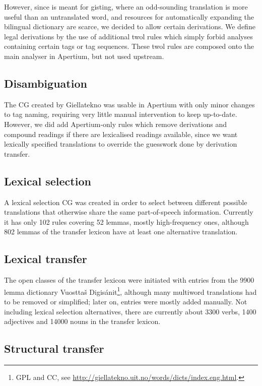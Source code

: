 However, since \smenob is meant for gisting, where an odd-sounding
translation is more useful than an untranslated word, and resources
for automatically expanding the bilingual dictionary are scarce, we
decided to allow certain derivations. We define legal derivations by
the use of additional twol rules which simply forbid analyses
containing certain tags or tag sequences. These twol rules are
composed onto the main analyser in Apertium, but not used upstream.

\subsection{Disambiguation}
The CG created by Giellatekno was usable in Apertium with only minor
changes to tag naming, requiring very little manual intervention to
keep up-to-date. However, we did add Apertium-only rules which remove
derivations and compound readings if there are lexicalised readings
available, since we want lexically specified translations to override
the guesswork done by derivation transfer.

\subsection{Lexical selection}
A lexical selection CG was created in order to select between
different possible translations that otherwise share the same
part-of-speech information. Currently it has only 102 rules covering
52 lemmas, mostly high-frequency ones, although 802 lemmas of the
transfer lexicon have at least one alternative translation.

\subsection{Lexical transfer}
The open classes of the transfer lexicon were initiated with entries
from the 9900 lemma dictionary Vuosttaš Digisánit\footnote{GPL and CC,
  see
  \href{http://giellatekno.uit.no/words/dicts/index.eng.html}{http://giellatekno.uit.no/words/dicts/index.eng.html}.},
although many multiword translations had to be removed or simplified;
later on, entries were mostly added manually. Not including lexical
selection alternatives, there are currently about 3300 verbs, 1400
adjectives and 14000 nouns in the transfer lexicon.

\subsection{Structural transfer}
\label{sec:structural-transfer}


